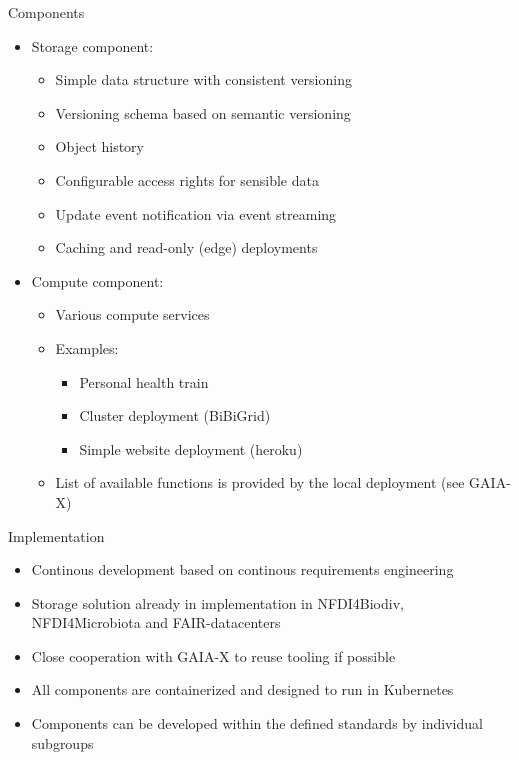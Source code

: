 \documentclass[aspectratio=169]{beamer}
\begin{document}
	\begin{frame}{Components}
		\begin{itemize}
			\item Storage component:
			\begin{itemize}
				\item Simple data structure with consistent versioning
				\item Versioning schema based on semantic versioning
				\item Object history
				\item Configurable access rights for sensible data
				\item Update event notification via event streaming
				\item Caching and read-only (edge) deployments
			\end{itemize}
			\item Compute component:
			\begin{itemize}
				\item Various compute services
				\item Examples:
				\begin{itemize}
					\item Personal health train
					\item Cluster deployment (BiBiGrid)
					\item Simple website deployment (heroku)
				\end{itemize}
				\item List of available functions is provided by the local deployment (see GAIA-X)
			\end{itemize}
		\end{itemize}
	\end{frame}
	
	\begin{frame}{Implementation}
		\begin{itemize}
			\item Continous development based on continous requirements engineering
			\item Storage solution already in implementation in NFDI4Biodiv, NFDI4Microbiota and FAIR-datacenters
			\item Close cooperation with GAIA-X to reuse tooling if possible
			\item All components are containerized and designed to run in Kubernetes
			\item Components can be developed within the defined standards by individual subgroups
		\end{itemize}
	\end{frame}

	
	
\end{document}
